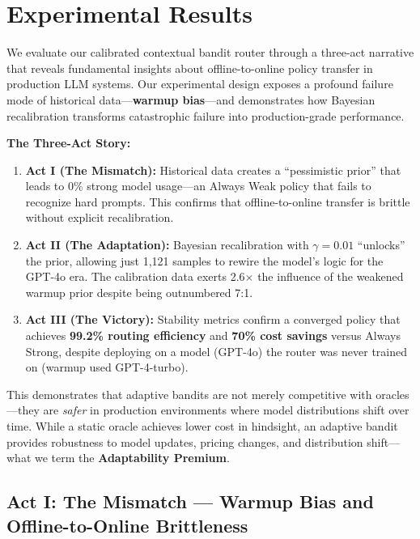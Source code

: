 
\section{Experimental Results}
\label{sec:results}

We evaluate our calibrated contextual bandit router through a three-act narrative that reveals fundamental insights about offline-to-online policy transfer in production LLM systems. Our experimental design exposes a profound failure mode of historical data—\textbf{warmup bias}—and demonstrates how Bayesian recalibration transforms catastrophic failure into production-grade performance.

\textbf{The Three-Act Story:}
\begin{enumerate}
    \item \textbf{Act I (The Mismatch):} Historical data creates a ``pessimistic prior'' that leads to 0\% strong model usage—an Always Weak policy that fails to recognize hard prompts. This confirms that offline-to-online transfer is brittle without explicit recalibration.
    
    \item \textbf{Act II (The Adaptation):} Bayesian recalibration with $\gamma=0.01$ ``unlocks'' the prior, allowing just 1,121 samples to rewire the model's logic for the GPT-4o era. The calibration data exerts 2.6$\times$ the influence of the weakened warmup prior despite being outnumbered 7:1.
    
    \item \textbf{Act III (The Victory):} Stability metrics confirm a converged policy that achieves \textbf{99.2\% routing efficiency} and \textbf{70\% cost savings} versus Always Strong, despite deploying on a model (GPT-4o) the router was never trained on (warmup used GPT-4-turbo).
\end{enumerate}

This demonstrates that adaptive bandits are not merely competitive with oracles—they are \emph{safer} in production environments where model distributions shift over time. While a static oracle achieves lower cost in hindsight, an adaptive bandit provides robustness to model updates, pricing changes, and distribution shift—what we term the \textbf{Adaptability Premium}.

\subsection{Act I: The Mismatch — Warmup Bias and Offline-to-Online Brittleness}
\label{sec:warmup_bias}

